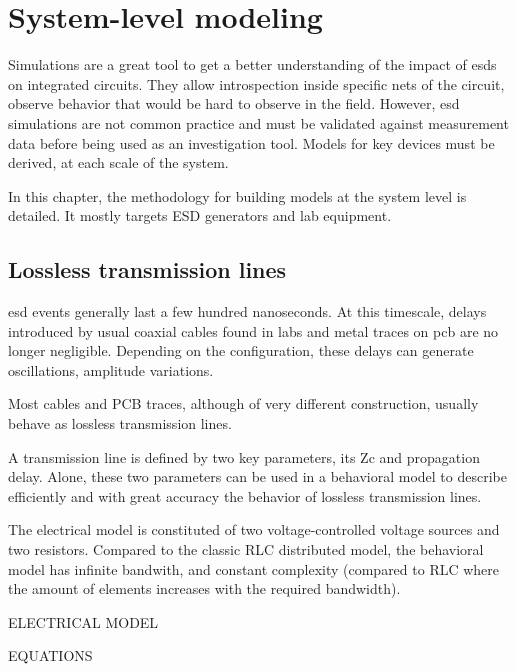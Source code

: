 \section{System-level modeling}

Simulations are a great tool to get a better understanding of the impact of \gls{esd}s on integrated circuits.
They allow introspection inside specific nets of the circuit, observe behavior that would be hard to observe in the field.
However, \gls{esd} simulations are not common practice and must be validated against measurement data before being used as an investigation tool.
Models for key devices must be derived, at each scale of the system.

In this chapter, the methodology for building models at the system level is detailed.
It mostly targets ESD generators and lab equipment.

\subsection{Lossless transmission lines}

\gls{esd} events generally last a few hundred nanoseconds.
At this timescale, delays introduced by usual coaxial cables found in labs and metal traces on \gls{pcb} are no longer negligible.
Depending on the configuration, these delays can generate oscillations, amplitude variations.

Most cables and PCB traces, although of very different construction, usually behave as lossless transmission lines.

A transmission line is defined by two key parameters, its \gls{Zc} and propagation delay.
Alone, these two parameters can be used in a behavioral model to describe efficiently and with great accuracy the behavior of lossless transmission lines.

The electrical model is constituted of two voltage-controlled voltage sources and two resistors.
Compared to the classic RLC distributed model, the behavioral model has infinite bandwith, and constant complexity (compared to RLC where the amount of elements increases with the required bandwidth).

ELECTRICAL MODEL

EQUATIONS
